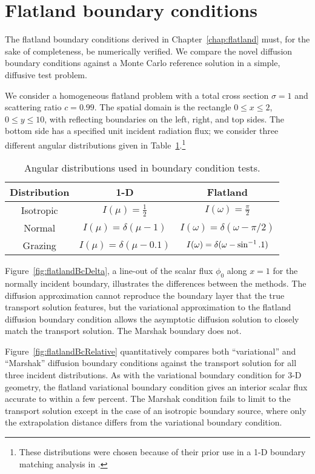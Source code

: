\section{Flatland boundary conditions}

The flatland boundary conditions derived in Chapter~\ref{chap:flatland} must,
for the sake of completeness, be numerically verified. We compare the novel
diffusion boundary conditions against a Monte Carlo reference solution in a
simple, diffusive test problem.

We consider a homogeneous flatland problem with a
total cross section $\sigma=1$ and scattering ratio $c=0.99$. The spatial 
domain is the rectangle $0 \le x \le 2$, $0 \le y \le 10$, with
reflecting boundaries on the left,
right, and top sides. The bottom side has a specified unit incident radiation
flux; we consider three different angular
distributions given in Table~\ref{tab:angularDistributions}.\footnote{These
distributions were chosen because of their prior use in a 1-D boundary
matching analysis in \cite{Dav2006}.}

\begin{table}[htb]
  \centering
  \begin{tabular}{ccc}
\toprule
    Distribution & 1-D & Flatland
\\ \midrule
Isotropic & $I(\mu) = \frac{1}{2}$ & $I(\omega) = \frac{\pi}{2}$
\\
Normal & $I(\mu) = \delta(\mu-1)$ & $I(\omega) = \delta(\omega-\pi/2)$
\\
Grazing & $I(\mu) = \delta(\mu-0.1)$ & $I(\omega) = \delta(\omega-\sin^{-1}.1)$
\\ \bottomrule
  \end{tabular}
  \caption{Angular distributions used in boundary condition tests.}
  \label{tab:angularDistributions}
\end{table}

Figure~\ref{fig:flatlandBcDelta},
 a line-out of the scalar flux $\phi_0$ along
$x=1$ for the normally incident boundary, illustrates the differences between
the methods. The diffusion
approximation cannot reproduce the boundary layer that the true transport
solution features, but the variational approximation to the flatland
diffusion boundary condition allows the asymptotic diffusion solution to
closely match the transport solution. The Marshak boundary does not.

Figure~\ref{fig:flatlandBcRelative} quantitatively compares both ``variational'' and
``Marshak'' diffusion boundary conditions against the transport solution
for all three incident distributions.  
As with the variational boundary condition for 3-D geometry, the flatland
variational boundary condition gives an interior scalar flux accurate to within
a few percent. The Marshak condition fails to limit to the transport solution except in
the case of an isotropic boundary source, where only the extrapolation
distance differs from the variational boundary condition.


